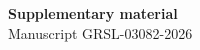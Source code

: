 \documentclass[10pt]{article}
\begin{document}
\begin{center}\Large\textbf{Supplementary material}\\[2pt]\normalsize Manuscript GRSL-03082-2026\end{center}
\vspace{6pt}

\renewcommand{\thetable}{S1}


\renewcommand{\thetable}{S2}
\clearpage


\renewcommand{\thetable}{S3}
\clearpage

\end{document}
